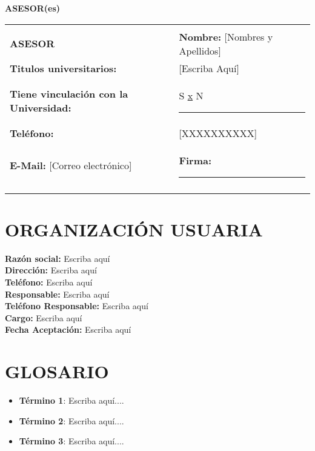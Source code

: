 \documentclass[12pt,letterpaper]{article}
\begin{document}
\textbf{ASESOR(es)}
\begin{table}[htb]		
	\begin{center}
		\begin{tabularx}{\textwidth}{|XX|}
			\hline
			& \\
			\textbf{ASESOR} & \textbf{Nombre: }[Nombres y Apellidos] \\
			\textbf{Titulos universitarios: }  & [Escriba Aquí] \\
			\textbf{Tiene vinculación con la Universidad:} & S \underline{x} N \rule{6mm}{0.1mm}\\
			\textbf{Teléfono: } & [XXXXXXXXXX] \\
			\textbf{E-Mail: }[Correo electrónico] & \textbf{Firma: } \rule{50mm}{0.1mm} \\
			& \\
			\hline
		\end{tabularx}
	\end{center}
\end{table}	


\section{ORGANIZACIÓN USUARIA}
\textbf{Razón social:} Escriba aquí \\
\textbf{Dirección:} Escriba aquí \\
\textbf{Teléfono:} Escriba aquí \\
\textbf{Responsable:} Escriba aquí \\	
\textbf{Teléfono Responsable: }Escriba aquí \\
\textbf{Cargo: }Escriba aquí \\
\textbf{Fecha Aceptación: }Escriba aquí \\

\section{GLOSARIO}
\begin{itemize}
	\item \textbf{Término 1}: Escriba aquí....
	\item \textbf{Término 2}: Escriba aquí....
	\item \textbf{Término 3}: Escriba aquí....
\end{itemize}
\end{document}
